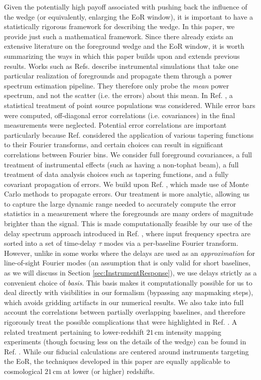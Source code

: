 \documentclass[twocolumn,aps,prd,nofootinbib,showpacs]{revtex4-1}
\begin{document}
Given the potentially high payoff associated with pushing back the influence of the wedge (or equivalently, enlarging the EoR window), it is important to have a statistically rigorous framework for describing the wedge.  In this paper, we provide just such a mathematical framework.  Since there already exists an extensive literature on the foreground wedge and the EoR window, it is worth summarizing the ways in which this paper builds upon and extends previous results.  Works such as Refs. \cite{Datta2010,Vedantham2012,Morales2012} describe instrumental simulations that take one particular realization of foregrounds and propagate them through a power spectrum estimation pipeline.  They therefore only probe the \emph{mean} power spectrum, and not the scatter (i.e. the errors) about this mean.  In Ref. \cite{Thyagarajan2013}, a statistical treatment of point source populations was considered.  While error bars were computed, off-diagonal error correlations (i.e. covariances) in the final measurements were neglected.  Potential error correlations are important particularly because Ref. \cite{Thyagarajan2013} considered the application of various tapering functions to their Fourier transforms, and certain choices can result in significant correlations between Fourier bins.  We consider full foreground covariances, a full treatment of instrumental effects (such as having a non-tophat beam), a full treatment of data analysis choices such as tapering functions, and a fully covariant propagation of errors.  We build upon Ref. \cite{Trott2012}, which made use of Monte Carlo methods to propagate errors.  Our treatment is more analytic, allowing us to capture the large dynamic range needed to accurately compute the error statistics in a measurement where the foregrounds are many orders of magnitude brighter than the signal.  This is made computationally feasible by our use of the delay spectrum approach introduced in Ref. \cite{Parsons2012b}, where input frequency spectra are sorted into a set of time-delay $\tau$ modes via a per-baseline Fourier transform.  However, unlike in some works where the delays are used as an \emph{approximation} for line-of-sight Fourier modes (an assumption that is only valid for short baselines, as we will discuss in Section \ref{sec:InstrumentResponse}), we use delays strictly as a convenient choice of \emph{basis}.  This basis makes it computationally possible for us to deal directly with visibilities in our formalism (bypassing any mapmaking steps), which avoids gridding artifacts in our numerical results.  We also take into full account the correlations between partially overlapping baselines, and therefore rigorously treat the possible complications that were highlighted in Ref. \cite{Hazelton2013}.  A related treatment pertaining to lower-redshift $21\,\textrm{cm}$ intensity mapping experiments (though focusing less on the details of the wedge) can be found in Ref. \cite{Shaw2014b}.  While our fiducial calculations are centered around instruments targeting the EoR, the techniques developed in this paper are equally applicable to cosmological $21\,\textrm{cm}$ at lower (or higher) redshifts.
\end{document}
